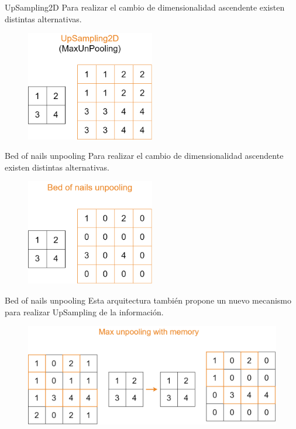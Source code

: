 \begin{frame}{UpSampling2D}
Para realizar el \alert{cambio de dimensionalidad} ascendente existen distintas alternativas.

\begin{figure}
    \centering
    \includegraphics[width=0.5\textwidth]{figures/Tema 4/UpSampling2D.png}
\end{figure}
\end{frame}

\begin{frame}{Bed of nails unpooling}
Para realizar el \alert{cambio de dimensionalidad} ascendente existen distintas alternativas.

\begin{figure}
    \centering
    \includegraphics[width=0.5\textwidth]{figures/Tema 4/BedOfNails.png}
\end{figure}
\end{frame}

\begin{frame}{Bed of nails unpooling}
Esta arquitectura también propone un nuevo mecanismo para realizar \alert{UpSampling} de la información.

\begin{figure}
    \centering
    \includegraphics[width=\textwidth]{figures/Tema 4/MaxWithMemory.png}
\end{figure}
\end{frame}

